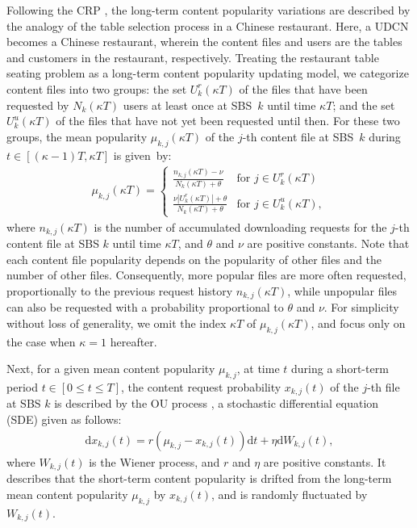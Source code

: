 \documentclass{book}
\begin{document}
Following the CRP \cite{Living,CRP_1}, the long-term content popularity variations are described by the analogy of the table selection process in a Chinese restaurant. Here, a UDCN becomes a Chinese restaurant, wherein the content files and users are the tables and customers in the restaurant, respectively. Treating the restaurant table seating problem as a long-term content popularity updating model, we categorize content files into two groups: the set $U^r_k(\kappa T)$ of the files that have been requested by $N_k(\kappa T)$ users at least once at SBS~$k$ until time $\kappa T$; and the set $U^u_k(\kappa T)$ of the files that have not yet been requested until then. For these two groups, the mean popularity $\mu_{k,j}(\kappa T)$ of the $j$-th content file at SBS~$k$ during $t\in [(\kappa-1)T, \kappa T]$ is given~by:
\begin{align}
\mu_{k,j}(\kappa T)  = \left\{ \begin{array}{ll}
  \frac{n_{k,j}(\kappa T)-\nu}{N_k(\kappa T)+\theta} & \textrm{for $j \in U^r_k(\kappa T)$}\\
  \frac{\nu |U^r_k(\kappa T)|+\theta}{N_k(\kappa T)+\theta} & \textrm{for $j \in U^u_k(\kappa T)$},
\end{array} \right.  \label{avg_Nk}
\end{align}
where $n_{k,j}(\kappa T)$ is the number of accumulated downloading requests for the $j$-th content file at SBS $k$ until time $\kappa T$, and $\theta$ and $\nu$ are positive constants. Note that each content file popularity depends on the popularity of other files and the number of other files. Consequently, more popular files are more often requested, proportionally to the previous request history $n_{k,j}(\kappa T)$, while unpopular files can also be requested with a probability proportional to $\theta$ and $\nu$. For simplicity without loss of generality, we omit the index $\kappa T$ of $\mu_{k,j}(\kappa T)$, and focus only on the case when $\kappa=1$ hereafter.


Next, for a given mean content popularity $\mu_{k,j}$, at time $t$ during a short-term period $t \in [0 \leq t \leq T]$, the content request probability $x_{k,j}(t)$ of the $j$-th file at SBS $k$ is described by the OU process \cite{MR_model}, a stochastic differential equation (SDE) given as follows:
\begin{align}
  \text{d}x_{k,j}(t)= r(\mu_{k,j}-x_{k,j}(t))\text{d}t+\eta \text{d}W_{k,j}(t), \label{SDE_x}
  \end{align}   
  where $W_{k,j}(t)$ is the Wiener process, and $r$ and $\eta$ are positive constants. It describes that the short-term content popularity is drifted from the long-term mean content popularity $\mu_{k,j}$ by $x_{k,j}(t)$, and is randomly fluctuated by $W_{k,j}(t)$. 
\end{document}
